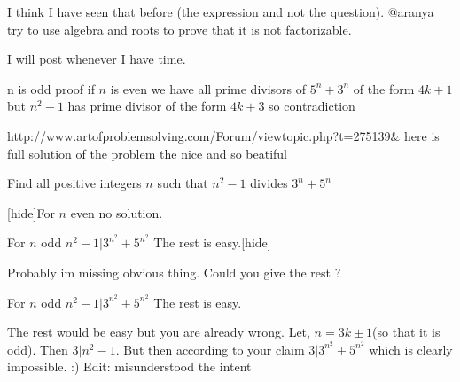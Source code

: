 \begin{solution}
	I think I have seen that before (the expression and not the question).
@aranya try to use algebra and roots to prove that it is not factorizable.

I will post whenever I have time.
\end{solution}



\begin{solution}
	n is odd 
proof
if $n$ is even we have all prime divisors of $5^n+3^n$ of the form 
$4k+1$ but $n^2-1$ has prime divisor of the form $4k+3$ so contradiction
\end{solution}



\begin{solution}
	http://www.artofproblemsolving.com/Forum/viewtopic.php?t=275139& 
here is full solution of the problem the nice and so beatiful
\end{solution}



\begin{solution}
	\begin{tcolorbox}Find all positive integers $n$ such that $n^2-1$ divides $3^n+5^n$\end{tcolorbox}

[hide]For $n$ even no solution.

For $n$ odd $n^2-1|3^{{n}^{2}}+5^{{n}^{2}}$   The rest is easy.[\/hide]
\end{solution}



\begin{solution}
	Probably im missing obvious thing. Could you give the rest ?
\end{solution}



\begin{solution}
	\begin{tcolorbox}
For $n$ odd $n^2-1|3^{{n}^{2}}+5^{{n}^{2}}$   The rest is easy.\end{tcolorbox}
The rest would be easy but you are already wrong. Let, $n=3k\pm1$(so that it is odd). Then $3|n^2-1$. But then according to your claim $3|3^{n^2}+5^{n^2}$ which is clearly impossible. :)
Edit: misunderstood the intent
\end{solution}



